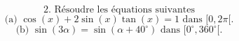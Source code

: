 \documentclass{article}
\begin{document}
\[\text{2. Résoudre les équations suivantes}\]
\[\text{(a) } \cos(x) + 2 \sin(x) \tan(x) = 1 \text{ dans } [0, 2\pi[.\]
\[\text{(b) } \sin(3\alpha) = \sin(\alpha + 40^\circ) \text{ dans } [0^\circ, 360^\circ[.\] 
\end{document}
